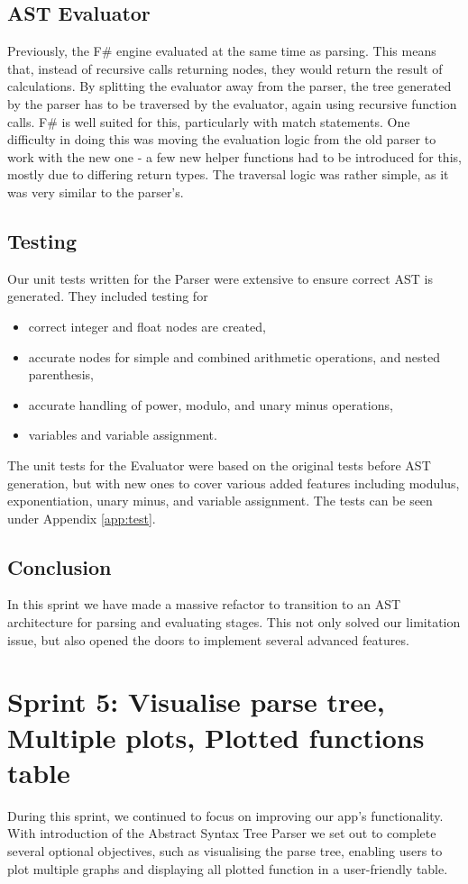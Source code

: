 \documentclass[a4paper, oneside, 11pt]{report}
\begin{document}
\subsection{AST Evaluator}
Previously, the F\# engine evaluated at the same time as parsing. This means that, instead of recursive calls returning nodes, they would return the result of calculations. By splitting the evaluator away from the parser, the tree generated by the parser has to be traversed by the evaluator, again using recursive function calls. F\# is well suited for this, particularly with match statements.
One difficulty in doing this was moving the evaluation logic from the old parser to work with the new one - a few new helper functions had to be introduced for this, mostly due to differing return types. The traversal logic was rather simple, as it was very similar to the parser's.

\subsection{Testing}
Our unit tests written for the Parser were extensive to ensure correct AST is generated. They included testing for
\begin{itemize}
    \item correct integer and float nodes are created, 
    \item accurate nodes for simple and combined arithmetic operations, and nested parenthesis,
    \item accurate handling of power, modulo, and unary minus operations, 
    \item variables and variable assignment. 
\end{itemize}
The unit tests for the Evaluator were based on the original tests before AST generation, but with new ones to cover various added features including modulus, exponentiation, unary minus, and variable assignment.
The tests can be seen under Appendix \ref{app:test}.

\subsection{Conclusion}
In this sprint we have made a massive refactor to transition to an AST architecture for parsing and evaluating stages. This not only solved our limitation issue, but also opened the doors to implement several advanced features.

\section{Sprint 5: Visualise parse tree, Multiple plots, Plotted functions table}
During this sprint, we continued to focus on improving our app's functionality. With introduction of the Abstract Syntax Tree Parser we set out to complete several optional objectives, such as visualising the parse tree, enabling users to plot multiple graphs and displaying all plotted function in a user-friendly table.
\end{document}
